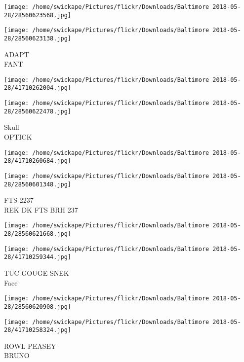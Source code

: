 \documentclass[10pt,letterpaper]{article}
\begin{document}
\texttt{[image: /home/swickape/Pictures/flickr/Downloads/Baltimore 2018-05-28/28560623568.jpg]}

\vspace{0.25in}
\texttt{[image: /home/swickape/Pictures/flickr/Downloads/Baltimore 2018-05-28/28560623138.jpg]}

ADAPT\\
FANT\\
\pagebreak

\texttt{[image: /home/swickape/Pictures/flickr/Downloads/Baltimore 2018-05-28/41710262004.jpg]}

\vspace{0.25in}
\texttt{[image: /home/swickape/Pictures/flickr/Downloads/Baltimore 2018-05-28/28560622478.jpg]}

Skull\\
OPTICK\\
\pagebreak

\texttt{[image: /home/swickape/Pictures/flickr/Downloads/Baltimore 2018-05-28/41710260684.jpg]}

\vspace{0.25in}
\texttt{[image: /home/swickape/Pictures/flickr/Downloads/Baltimore 2018-05-28/28560601348.jpg]}

FTS 2237\\
REK DK FTS BRH 237\\
\pagebreak

\texttt{[image: /home/swickape/Pictures/flickr/Downloads/Baltimore 2018-05-28/28560621668.jpg]}

\vspace{0.25in}
\texttt{[image: /home/swickape/Pictures/flickr/Downloads/Baltimore 2018-05-28/41710259344.jpg]}

TUC GOUGE SNEK\\
Face\\
\pagebreak

\texttt{[image: /home/swickape/Pictures/flickr/Downloads/Baltimore 2018-05-28/28560620908.jpg]}

\vspace{0.25in}
\texttt{[image: /home/swickape/Pictures/flickr/Downloads/Baltimore 2018-05-28/41710258324.jpg]}

ROWL PEASEY\\
BRUNO\\
\pagebreak
\end{document}
